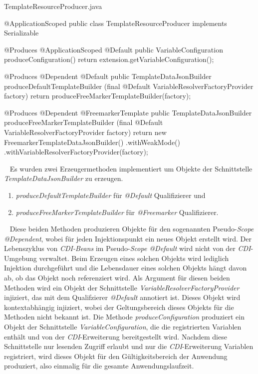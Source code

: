 \begin{program}[h]
\caption{TemplateResourceProducer.java}
\label{prog:templateResourceProducer}
\begin{JavaCode}
@ApplicationScoped
public class TemplateResourceProducer implements Serializable {
    @Produces
    @ApplicationScoped
    @Default
    public VariableConfiguration produceConfiguration() {
        return extension.getVariableConfiguration();
    }
    
    @Produces
    @Dependent
    @Default
    public TemplateDataJsonBuilder produceDefaultTemplateBuilder
          (final @Default VariableResolverFactoryProvider factory) {
        return produceFreeMarkerTemplateBuilder(factory);
    }

    @Produces
    @Dependent
    @FreemarkerTemplate
    public TemplateDataJsonBuilder produceFreeMarkerTemplateBuilder
           (final @Default VariableResolverFactoryProvider factory) {
        return new FreemarkerTemplateDataJsonBuilder()
                	.withWeakMode()
                	.withVariableResolverFactoryProvider(factory);
    }
}
\end{JavaCode}
\end{program}
\ \newline
Es wurden zwei Erzeugermethoden implementiert um Objekte der Schnittstelle \emph{TemplateDataJsonBuilder} zu erzeugen.
\begin{enumerate}
	\item\emph{produceDefaultTemplateBuilder} für \emph{@Default} Qualifizierer und 
	\item\emph{produceFreeMarkerTemplateBuilder} für \emph{@Freemarker} Qualifizierer.	
\end{enumerate}
\ \newline
Diese beiden Methoden produzieren Objekte für den sogenannten Pseudo-\emph{Scope @Dependent}, wobei für jeden Injektionspunkt ein neues Objekt erstellt wird. Der Lebenszyklus von \emph{CDI-Beans} im Pseudo-\emph{Scope @Default} wird nicht von der \emph{CDI}-Umgebung verwaltet. Beim Erzeugen eines solchen Objekts wird lediglich Injektion durchgeführt und die Lebensdauer eines solchen Objekts hängt davon ab, ob das Objekt noch referenziert wird. Als Argument für diesen beiden Methoden wird ein Objekt der Schnittstelle \emph{VariableResolverFactoryProvider} injiziert, das mit dem Qualifzierer \emph{@Default} annotiert ist. Dieses Objekt wird kontextabhängig injiziert, wobei der Geltungsbereich dieses Objekts für die Methoden nicht bekannt ist. 
\newline
\newline
Die Methode \emph{produceConfiguration} produziert ein Objekt der Schnittstelle  \emph{VariableConfiguration}, die die registrierten Variablen enthält und von der \emph{CDI}-Erweiterung bereitgestellt wird. Nachdem diese Schnittstelle nur lesenden Zugriff erlaubt und nur die \emph{CDI}-Erweiterung Variablen registriert, wird dieses Objekt für den Gültigkeitsbereich der Anwendung produziert, also einmalig für die gesamte Anwendungslaufzeit.

